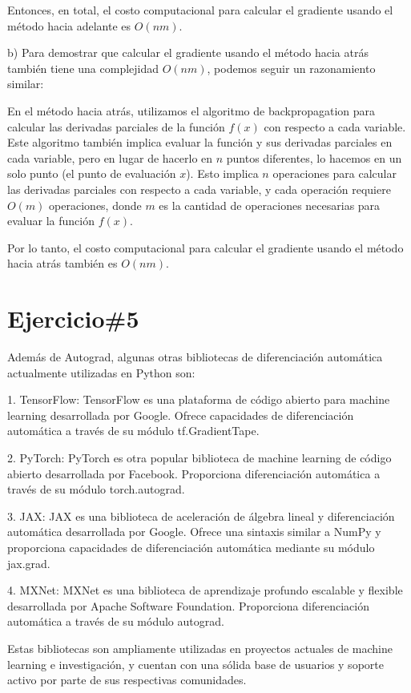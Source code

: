 \documentclass[a4paper,12pt]{article}
\begin{document}
Entonces, en total, el costo computacional para calcular el gradiente usando el método hacia adelante es \( O(nm) \).

b) Para demostrar que calcular el gradiente usando el método hacia atrás también tiene una complejidad \( O(nm) \), podemos seguir un razonamiento similar:

En el método hacia atrás, utilizamos el algoritmo de backpropagation para calcular las derivadas parciales de la función \( f(x) \) con respecto a cada variable. 
Este algoritmo también implica evaluar la función y sus derivadas parciales en cada variable, pero en lugar de hacerlo en \( n \) puntos diferentes, lo hacemos en un 
solo punto (el punto de evaluación \( x \)). Esto implica \( n \) operaciones para calcular las derivadas parciales con respecto a cada variable, y cada operación requiere 
\( O(m) \) operaciones, donde \( m \) es la cantidad de operaciones necesarias para evaluar la función \( f(x) \).

Por lo tanto, el costo computacional para calcular el gradiente usando el método hacia atrás también es \( O(nm) \).

\section*{Ejercicio\#5}

Además de Autograd, algunas otras bibliotecas de diferenciación automática actualmente utilizadas en Python son:

1. TensorFlow: TensorFlow es una plataforma de código abierto para machine learning desarrollada por Google. Ofrece capacidades de diferenciación automática a través de su módulo tf.GradientTape.

2. PyTorch: PyTorch es otra popular biblioteca de machine learning de código abierto desarrollada por Facebook. Proporciona diferenciación automática a través de su módulo torch.autograd.

3. JAX: JAX es una biblioteca de aceleración de álgebra lineal y diferenciación automática desarrollada por Google. Ofrece una sintaxis similar a NumPy y proporciona capacidades de diferenciación automática mediante su módulo jax.grad.

4. MXNet: MXNet es una biblioteca de aprendizaje profundo escalable y flexible desarrollada por Apache Software Foundation. Proporciona diferenciación automática a través de su módulo autograd.

Estas bibliotecas son ampliamente utilizadas en proyectos actuales de machine learning e investigación, y cuentan con una sólida base de usuarios y soporte activo por parte de sus respectivas comunidades.
\end{document}
